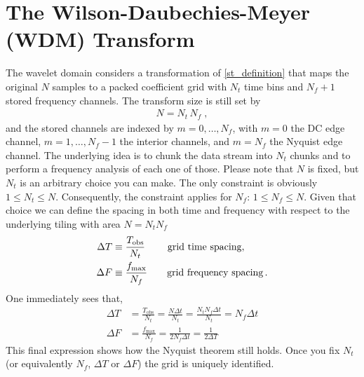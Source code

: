 \documentclass[%
 reprint,
superscriptaddress,
nofootinbib,
 amsmath,amssymb,
 aps,
colorlinks = true, 
linkcolor = blue, 
urlcolor = blue, 
citecolor = blue, 
anchorcolor = blue,
]{revtex4-2}
\begin{document}






\section{The Wilson-Daubechies-Meyer (WDM) Transform}

The wavelet domain considers a transformation of \eqref{st_definition} that maps the original $N$ samples to a packed coefficient grid with $N_t$ time bins and $N_f+1$ stored frequency channels. The transform size is still set by
\begin{align}\label{NtNf_def}
N=N_t\,N_f\;,
\end{align}
and the stored channels are indexed by $m=0,\dots,N_f$, with $m=0$ the DC edge channel, $m=1,\dots,N_f-1$ the interior channels, and $m=N_f$ the Nyquist edge channel. The underlying idea is to chunk the data stream into $N_t$ chunks and to perform a frequency analysis of each one of those. Please note that $N$ is fixed, but $N_t$ is an arbitrary choice you can make. The only constraint is obviously $1\le N_t\le N$. Consequently, the constraint applies for $N_f$: $1\le N_f\le N$.
Given that choice we can define the spacing in both time and frequency with respect to the underlying tiling with area $N = N_{t}N_{f}$
\begin{align}\label{DTDF}
\Delta T&\equiv\frac{T_{\text{obs}}}{N_t}\; \qquad \text{grid time spacing},\nonumber\\
\Delta F&\equiv\frac{f_{\rm max}}{N_f} \qquad \text{grid frequency spacing}\,.
\end{align}
One immediately sees that,
\begin{align}
\Delta T &= \frac{T_{\text{obs}}}{N_{t}} = \frac{N\Delta t}{N_{t}} = \frac{N_{t}N_{f}\Delta t}{N_{t}} = N_{f}\Delta t \\
\Delta F &= \frac{f_{\text{max}}}{N_{f}} = \frac{1}{2N_{f}\Delta t} = \frac{1}{2\Delta T}
\end{align}
This final expression shows how the Nyquist theorem still holds. Once you fix $N_t$ (or equivalently $N_f$, $\Delta T$ or $\Delta F$) the grid is uniquely identified.
\end{document}

